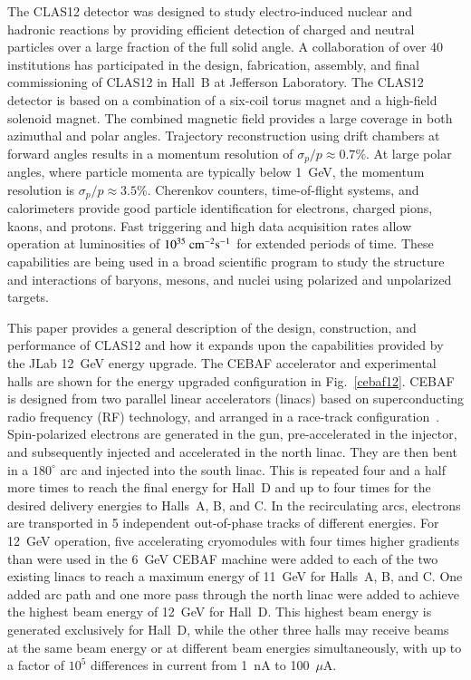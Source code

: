 \documentclass[final,3p,twocolumn]{elsarticle}
\begin{document}
The CLAS12 detector was designed to study electro-induced nuclear and hadronic reactions by providing efficient
detection of charged and neutral particles over a large fraction of the full solid angle. A collaboration of over 40
institutions has participated in the design, fabrication, assembly, and final commissioning of CLAS12 in Hall~B at 
Jefferson Laboratory. The CLAS12 detector is based on a combination of a six-coil torus magnet and a high-field
solenoid magnet. The combined magnetic field provides a large coverage in both azimuthal and polar angles.
Trajectory reconstruction using drift chambers at forward angles results in a momentum resolution of
${\sigma_p / p} \approx 0.7\%$. At large polar angles, where particle momenta are typically below 1~GeV, the 
momentum resolution is $\sigma_p / p \approx 3.5\%$. Cherenkov counters, time-of-flight systems, and
calorimeters provide good particle identification for electrons, charged pions, kaons, and protons. Fast triggering
and high data acquisition rates allow operation at luminosities of $10^{35}~\rm{cm}^{-2}\rm{s}^{-1}$ for extended
periods of time. These capabilities are being used in a broad scientific program to study the structure and
interactions of baryons, mesons, and nuclei using polarized and unpolarized targets. 

This paper provides a general description of the design, construction, and performance of CLAS12 and how it expands
upon the capabilities provided by the JLab 12~GeV energy upgrade. The CEBAF accelerator and experimental halls
are shown for the energy upgraded configuration in Fig.~\ref{cebaf12}. CEBAF is designed from two parallel linear
accelerators (linacs) based on superconducting radio frequency (RF) technology, and arranged in a race-track
configuration~\cite{Leemann:2001dg}. Spin-polarized electrons are generated in the gun, pre-accelerated in the
injector, and subsequently injected and accelerated in the north linac. They are then bent in a $180^\circ$ arc and
injected into the south linac. This is repeated four and a half more times to reach the final energy for Hall~D and up to
four times  for the desired delivery energies to Halls~A, B, and C. In the recirculating arcs, electrons are transported
in 5 independent out-of-phase tracks of different energies. For 12~GeV operation, five accelerating cryomodules with
four times higher gradients than were used in the 6~GeV CEBAF machine were added to each of the two existing linacs
to reach a maximum energy of 11~GeV for Halls~A, B, and C. One added arc path and one more pass through the north
linac were added to achieve the highest beam energy of 12~GeV for Hall~D. This highest beam energy is generated
exclusively for Hall~D, while the other three halls may receive beams at the same beam energy or at different beam
energies simultaneously, with up to a factor of $10^5$ differences in current from 1~nA to 100~$\mu$A.
\end{document}
